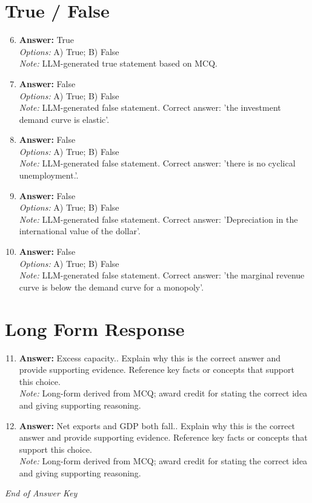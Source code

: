 \documentclass[12pt]{article}
\begin{document}
\section*{True / False}
\begin{enumerate}[label=\arabic*.]
\setcounter{enumi}{5}
\item \textbf{Answer:} True
\\ \textit{Options:} A) True; B) False
\\ \textit{Note:} LLM-generated true statement based on MCQ.
\item \textbf{Answer:} False
\\ \textit{Options:} A) True; B) False
\\ \textit{Note:} LLM-generated false statement. Correct answer: 'the investment demand curve is elastic'.
\item \textbf{Answer:} False
\\ \textit{Options:} A) True; B) False
\\ \textit{Note:} LLM-generated false statement. Correct answer: 'there is no cyclical unemployment.'.
\item \textbf{Answer:} False
\\ \textit{Options:} A) True; B) False
\\ \textit{Note:} LLM-generated false statement. Correct answer: 'Depreciation in the international value of the dollar'.
\item \textbf{Answer:} False
\\ \textit{Options:} A) True; B) False
\\ \textit{Note:} LLM-generated false statement. Correct answer: 'the marginal revenue curve is below the demand curve for a monopoly'.
\end{enumerate}

\section*{Long Form Response}
\begin{enumerate}[label=\arabic*.]
\setcounter{enumi}{10}
\item \textbf{Answer:} Excess capacity.. Explain why this is the correct answer and provide supporting evidence. Reference key facts or concepts that support this choice.
\\ \textit{Note:} Long-form derived from MCQ; award credit for stating the correct idea and giving supporting reasoning.
\item \textbf{Answer:} Net exports and GDP both fall.. Explain why this is the correct answer and provide supporting evidence. Reference key facts or concepts that support this choice.
\\ \textit{Note:} Long-form derived from MCQ; award credit for stating the correct idea and giving supporting reasoning.
\end{enumerate}

\vfill
\noindent\textit{End of Answer Key}
\end{document}
